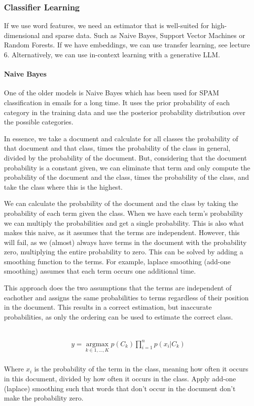 \subsubsection{Classifier Learning}

If we use word features, we need an estimator that is well-suited for
high-dimensional and sparse data. Such as Naive Bayes, Support Vector Machines
or Random Forests. If we have embeddings, we can use transfer learning,
see lecture 6. Alternatively, we can use in-context learning with a
generative LLM.

\paragraph{Naive Bayes}

One of the older models is Naive Bayes which has been used for SPAM
classification
in emails for a long time. It uses the prior probability of each category in the
training data and use the posterior probability distribution over the
possible categories.

In essence, we take a document and calculate for all classes the
probability of that document
and that class, times the probability of the class in general,
divided by the probability of
the document. But, considering that the document probability is a
constant given, we can eliminate
that term and only compute the probability of the document and the
class, times the probability of
the class, and take the class where this is the highest.

We can calculate the probability of the document and the class by
taking the probability of each
term given the class. When we have each term's probability we can
multiply the probabilities and
get a single probability. This is also what makes this naive, as it
assumes that the terms are
independent.
However, this will fail, as we (almost) always have terms in the
document with the probability zero,
multiplying the entire probability to zero. This can be solved by
adding a smoothing function to the
terms. For example, laplace smoothing (add-one smoothing) assumes
that each term occurs one additional
time.

This approach does the two assumptions that the terms are independent
of eachother and assigns the same
probabilities to terms regardless of their position in the document.
This results in a correct estimation, but inaccurate probabilities,
as only the ordering
can be used to estimate the correct class.

\begin{definition}
  ~\\
  \begin{align*}
    y = \operatorname*{argmax}_{k \in {1, ..., K}} p(C_k)
    \prod^n_{i=1} p(x_i | C_k)
  \end{align*}
  \\
  Where $x_i$ is the probability of the term in the class, meaning how often
  it occurs in this document, divided by how often it occurs in the class.
  Apply add-one (laplace) smoothing such that words that don't occur in the
  document don't make the probability zero.
\end{definition}

